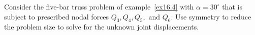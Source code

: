 \documentclass{AeroStructure-ERJohnson}
\begin{document}
\vspace*{-1.6pc}

\begin{example}\label{ex16.5}Consider the five-bar truss problem of example~\ref{ex16.4} with $\alpha=30^{\circ}$ that is subject to prescribed nodal forces $Q_{3}, Q_{4}, Q_{5}, \text { and } Q_{6}$. Use symmetry to reduce the problem size to solve for the unknown joint displacements.



\end{example}
\end{document}
